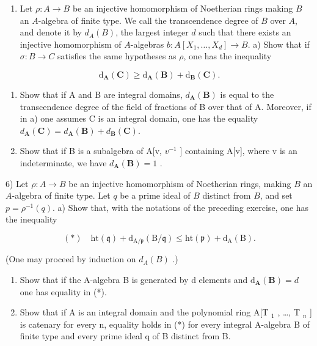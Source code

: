 \begin{enumerate}
\def\labelenumi{\arabic{enumi})}
\setcounter{enumi}{4}
\tightlist
\item
  Let \(\rho: A \to B\) be an injective homomorphism of Noetherian rings making \(B\) an \(A\)-algebra of finite type. We call the transcendence degree of \(B\) over \(A\), and denote it by \(d_A(B)\), the largest integer \(d\) such that there exists an injective homomorphism of \(A\)-algebras \(b: A[X_1, \ldots, X_d] \to B\). a) Show that if \(\sigma: B \to C\) satisfies the same hypotheses as \(\rho\), one has the inequality
\end{enumerate}

\[
\mathrm{d} _ {\mathbf {A}} (\mathbf {C}) \geqslant \mathrm{d} _ {\mathbf {A}} (\mathbf {B}) + \mathrm{d} _ {\mathbf {B}} (\mathbf {C}).
\]

\begin{enumerate}
\def\labelenumi{\alph{enumi})}
\setcounter{enumi}{1}
\item
  Show that if A and B are integral domains, \(d_{\mathbf{A}}(\mathbf{B})\) is equal to the transcendence degree of the field of fractions of B over that of A. Moreover, if in a) one assumes C is an integral domain, one has the equality \(d_{\mathbf{A}}(\mathbf{C}) = d_{\mathbf{A}}(\mathbf{B}) + d_{\mathbf{B}}(\mathbf{C})\).
\item
  Show that if B is a subalgebra of A{[}v, \(v^{-1}\) {]} containing A{[}v{]}, where v is an indeterminate, we have \(d_{\mathbf{A}}(\mathbf{B}) = 1\) .
\end{enumerate}

6) Let \(\rho: A \to B\) be an injective homomorphism of Noetherian rings, making \(B\) an \(A\)-algebra of finite type. Let \(q\) be a prime ideal of \(B\) distinct from \(B\), and set \(p = \rho^{-1}(q)\). a) Show that, with the notations of the preceding exercise, one has the inequality

\[
(*) \quad \mathrm{ht} (\mathfrak {q}) + \mathrm{d} _ {\mathrm{A} / \mathfrak {p}} (\mathrm{B} / \mathfrak {q}) \leqslant \mathrm{ht} (\mathfrak {p}) + \mathrm{d} _ {\mathrm{A}} (\mathrm{B}).
\]

(One may proceed by induction on \(d_{A}(B)\) .)

\begin{enumerate}
\def\labelenumi{\alph{enumi})}
\setcounter{enumi}{1}
\item
  Show that if the A-algebra B is generated by d elements and \(\mathrm{d}_{\mathbf{A}}(\mathbf{B}) = d\) one has equality in (*).
\item
  Show that if A is an integral domain and the polynomial ring A{[}T \(_{1}\) , \ldots, T \(_{n}\) {]} is catenary for every n, equality holds in (*) for every integral A-algebra B of finite type and every prime ideal q of B distinct from B.
\end{enumerate}

